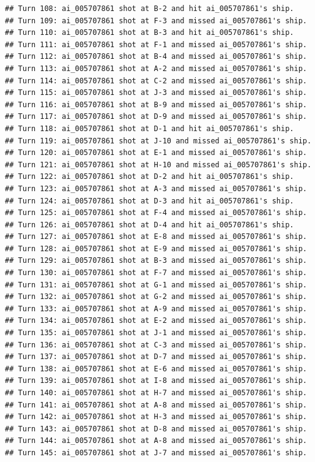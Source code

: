 \documentclass[
]{article}
\begin{document}
\begin{verbatim}
## Turn 108: ai_005707861 shot at B-2 and hit ai_005707861's ship.
## Turn 109: ai_005707861 shot at F-3 and missed ai_005707861's ship.
## Turn 110: ai_005707861 shot at B-3 and hit ai_005707861's ship.
## Turn 111: ai_005707861 shot at F-1 and missed ai_005707861's ship.
## Turn 112: ai_005707861 shot at B-4 and missed ai_005707861's ship.
## Turn 113: ai_005707861 shot at A-2 and missed ai_005707861's ship.
## Turn 114: ai_005707861 shot at C-2 and missed ai_005707861's ship.
## Turn 115: ai_005707861 shot at J-3 and missed ai_005707861's ship.
## Turn 116: ai_005707861 shot at B-9 and missed ai_005707861's ship.
## Turn 117: ai_005707861 shot at D-9 and missed ai_005707861's ship.
## Turn 118: ai_005707861 shot at D-1 and hit ai_005707861's ship.
## Turn 119: ai_005707861 shot at J-10 and missed ai_005707861's ship.
## Turn 120: ai_005707861 shot at E-1 and missed ai_005707861's ship.
## Turn 121: ai_005707861 shot at H-10 and missed ai_005707861's ship.
## Turn 122: ai_005707861 shot at D-2 and hit ai_005707861's ship.
## Turn 123: ai_005707861 shot at A-3 and missed ai_005707861's ship.
## Turn 124: ai_005707861 shot at D-3 and hit ai_005707861's ship.
## Turn 125: ai_005707861 shot at F-4 and missed ai_005707861's ship.
## Turn 126: ai_005707861 shot at D-4 and hit ai_005707861's ship.
## Turn 127: ai_005707861 shot at E-8 and missed ai_005707861's ship.
## Turn 128: ai_005707861 shot at E-9 and missed ai_005707861's ship.
## Turn 129: ai_005707861 shot at B-3 and missed ai_005707861's ship.
## Turn 130: ai_005707861 shot at F-7 and missed ai_005707861's ship.
## Turn 131: ai_005707861 shot at G-1 and missed ai_005707861's ship.
## Turn 132: ai_005707861 shot at G-2 and missed ai_005707861's ship.
## Turn 133: ai_005707861 shot at A-9 and missed ai_005707861's ship.
## Turn 134: ai_005707861 shot at E-2 and missed ai_005707861's ship.
## Turn 135: ai_005707861 shot at J-1 and missed ai_005707861's ship.
## Turn 136: ai_005707861 shot at C-3 and missed ai_005707861's ship.
## Turn 137: ai_005707861 shot at D-7 and missed ai_005707861's ship.
## Turn 138: ai_005707861 shot at E-6 and missed ai_005707861's ship.
## Turn 139: ai_005707861 shot at I-8 and missed ai_005707861's ship.
## Turn 140: ai_005707861 shot at H-7 and missed ai_005707861's ship.
## Turn 141: ai_005707861 shot at A-8 and missed ai_005707861's ship.
## Turn 142: ai_005707861 shot at H-3 and missed ai_005707861's ship.
## Turn 143: ai_005707861 shot at D-8 and missed ai_005707861's ship.
## Turn 144: ai_005707861 shot at A-8 and missed ai_005707861's ship.
## Turn 145: ai_005707861 shot at J-7 and missed ai_005707861's ship.

\end{verbatim}
\end{document}
